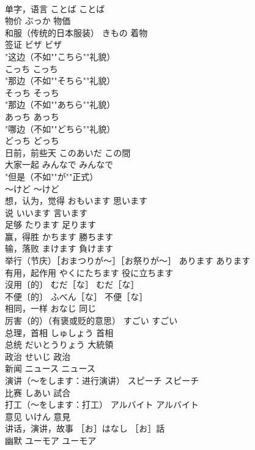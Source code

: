 \documentclass[8pt]{extreport}
\begin{document}
\begin{CJK}{UTF8}{min}
\\	单字，语言	ことば	ことば
\\	物价	ぶっか	物価
\\	和服（传统的日本服装）	きもの	着物
\\	签证	ビザ	ビザ
\\	"这边（不如""こちら""礼貌）
\\	こっち	こっち
\\	"那边（不如""そちら""礼貌）
\\	そっち	そっち
\\	"那边（不如""あちら""礼貌）
\\	あっち	あっち
\\	"哪边（不如""どちら""礼貌）
\\	どっち	どっち
\\	日前，前些天	このあいだ	この間
\\	大家一起	みんなで	みんなで
\\	"但是（不如""が""正式）
\\	～けど	～けど
\\	想，认为，觉得	おもいます	思います
\\	说	いいます	言います
\\	足够	たります	足ります
\\	赢，得胜	かちます	勝ちます
\\	输，落败	まけます	負けます
\\	举行（节庆）［おまつりが～］［お祭りが～］	あります	あります
\\	有用，起作用	やくにたちます	役に立ちます
\\	沒用〔的〕	むだ［な］	むだ［な］
\\	不便〔的〕	ふべん［な］	不便［な］
\\	相同，一样	おなじ	同じ
\\	厉害（的）（有褒或贬的意思）	すごい	すごい
\\	总理，首相	しゅしょう	首相
\\	总统	だいとうりょう	大統領
\\	政治	せいじ	政治
\\	新闻	ニュース	ニュース
\\	演讲（～をします：进行演讲）	スピーチ	スピーチ
\\	比赛	しあい	試合
\\	打工（～をします：打工）	アルバイト	アルバイト
\\	意见	いけん	意見
\\	讲话，演讲，故事	［お］はなし	［お］話
\\	幽默	ユーモア	ユーモア

\end{CJK}
\end{document}
